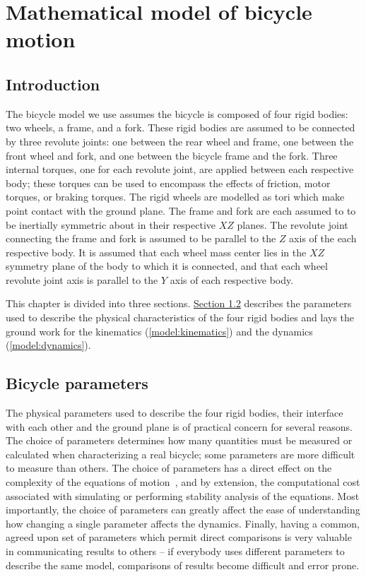 \chapter{Mathematical model of bicycle motion} \label{chapter2}

\section{Introduction}
The bicycle model we use assumes the bicycle is composed of four rigid bodies:
two wheels, a frame, and a fork. These rigid bodies are assumed to be connected
by three revolute joints: one between the rear wheel and frame, one between the
front wheel and fork, and one between the bicycle frame and the fork. Three
internal torques, one for each revolute joint, are applied between each
respective body; these torques can be used to encompass the effects of
friction, motor torques, or braking torques. The rigid wheels are modelled as
tori which make point contact with the ground plane. The frame and fork are
each assumed to to be inertially symmetric about in their respective $XZ$
planes. The revolute joint connecting the frame and fork is assumed to be
parallel to the $Z$ axis of the each respective body. It is assumed that each
wheel mass center lies in the $XZ$ symmetry plane of the body to which it is
connected, and that each wheel revolute joint axis is parallel to the $Y$ axis
of each respective body.

This chapter is divided into three sections.
\hyperref[model:bicycle_parameters]{Section \ref{model:bicycle_parameters}}
describes the parameters used to describe the physical characteristics of the
four rigid bodies and lays the ground work for the kinematics
(\autoref{model:kinematics}) and the dynamics (\autoref{model:dynamics}).

\section{Bicycle parameters} \label{model:bicycle_parameters}
The physical parameters used to describe the four rigid bodies, their interface
with each other and the ground plane is of practical concern for several
reasons. The choice of parameters determines how many quantities must be
measured or calculated when characterizing a real bicycle; some parameters are
more difficult to measure than others. The choice of parameters has a direct
effect on the complexity of the equations of
motion~\cite{Wittenburg2008,Mitiguy2001}, and by extension, the computational
cost associated with simulating or performing stability analysis of the
equations. Most importantly, the choice of parameters can greatly affect the
ease of understanding how changing a single parameter affects the dynamics.
Finally, having a common, agreed upon set of parameters which permit direct
comparisons is very valuable in communicating results to others -- if everybody
uses different parameters to describe the same model, comparisons of results
become difficult and error prone.


